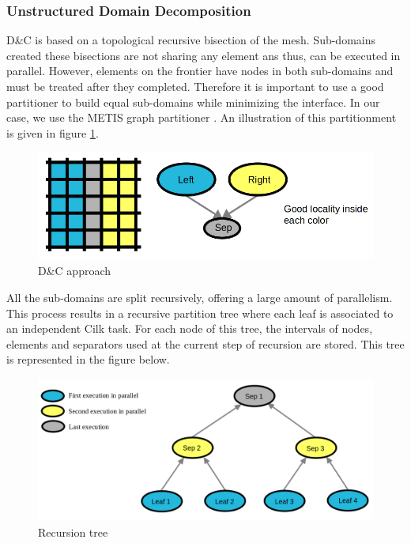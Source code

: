 \documentclass{IOS-Book-Article}
\begin{document}
\subsubsection{Unstructured Domain Decomposition}
D\&C is based on a topological recursive bisection of the mesh. Sub-domains created these bisections are not sharing any element ans thus, can be executed in parallel.
However, elements on the frontier have nodes in both sub-domains and must be treated after they completed.
Therefore it is important to use a good partitioner to build equal sub-domains while minimizing the interface. In our case, we use the METIS graph partitioner \cite{Metis}.
An illustration of this partitionment is given in figure \ref{fig:DCapp}.
\begin{figure}[htp]
 \centering
 \includegraphics[scale=0.25]{DC_approach.png}
 \caption{D\&C approach}
 \label{fig:DCapp}
\end{figure}
 
All the sub-domains are split recursively, offering a large amount of parallelism.
This process results in a recursive partition tree where each leaf is associated to an independent Cilk task.
For each node of this tree, the intervals of nodes, elements and separators used at the current step of recursion are stored.
This tree is represented in the figure below.
\begin{figure}[htp]
 \centering
 \includegraphics[scale=0.25]{Recursion_tree.png}
 \caption{Recursion tree}
 \label{fig:RecTree}
\end{figure}
\end{document}
